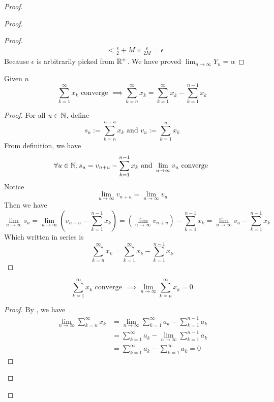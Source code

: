 \documentclass{report}
\begin{document}
\begin{proof}
\begin{proof}
\begin{proof}
\begin{align}
  &<\frac{\epsilon}{2}+M\times \frac{\epsilon }{2M}=\epsilon 
\end{align}
Because $\epsilon $ is arbitrarily picked from $\mathbb{R}^+$. We have proved  $\lim_{n\to\infty}Y_n=\alpha $
\end{proof}
\begin{lemma}
\label{6.4.1}
Given $n$
\begin{equation}
  \sum_{k=1}^\infty x_k\text{ converge }\implies \sum_{k=n}^\infty x_k=\sum_{k=1}^\infty x_k-\sum_{k=1}^{n-1}x_k
\end{equation}
\end{lemma}
\begin{proof}
For all $u\in\mathbb{N}$, define 
\begin{equation}
s_u:=\sum_{k=n}^{n+u}x_k\text{ and }v_u:=\sum_{k=1}^{u}x_k
\end{equation}
From definition, we have
\begin{equation}
  \forall u\in\mathbb{N},s_u=v_{n+u}-\sum_{k=1}^{n-1}x_k\text{ and }\lim_{u\to\infty}v_u\text{ converge }
\end{equation}
Notice 
\begin{equation}
\lim_{u\to\infty}v_{n+u}=\lim_{u\to\infty}v_u
\end{equation}
Then we have
\begin{equation}
\lim_{u\to\infty}s_u=\lim_{u\to\infty} (v_{n+u}-\sum_{k=1}^{n-1}x_k)=(\lim_{u\to\infty}v_{n+u})-\sum_{k=1}^{n-1}x_k=\lim_{u\to\infty}v_u-\sum_{k=1}^{n-1}x_k
\end{equation}
Which written in series is
\begin{equation}
\sum_{k=n}^{\infty} x_k=\sum_{k=1}^\infty x_k-\sum_{k=1}^{n-1}x_k
\end{equation}
\end{proof}
\begin{lemma}
\label{6.4.2}
\begin{equation}
\sum_{k=1}^\infty x_k\text{ converge }\implies \lim_{n\to\infty}\sum_{k=n}^\infty x_k=0
\end{equation}
\end{lemma}
\begin{proof} 
By , we have
\begin{align}
  \lim_{n\to\infty}\sum_{k=n}^\infty x_k&=\lim_{n\to\infty}\sum_{k=1}^\infty a_k-\sum_{k=1}^{n-1}a_k\\
  &=\sum_{k=1}^\infty a_k-\lim_{n\to\infty}\sum_{k=1}^{n-1}a_k\\
  &=\sum_{k=1}^\infty a_k-\sum_{k=1}^\infty a_k=0
\end{align}

\end{proof}
\end{proof}
\end{proof}
\end{document}
